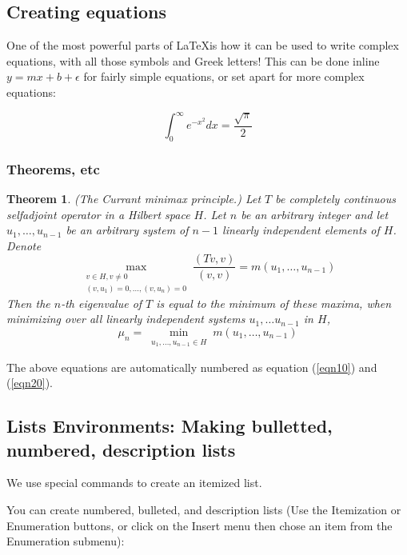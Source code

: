 \documentclass{book}\usepackage{knitr}
\newtheorem{theorem}{Theorem}
\begin{document}
\subsection{Creating equations}

One of the most powerful parts of \LaTeX is how it can be used to write complex equations, with all those symbols and Greek letters! This can be done inline $y = mx + b + \epsilon$ for fairly simple equations, or set apart for more complex equations:

\begin{equation}
\int_0^\infty e^{-x^2} dx=\frac{\sqrt{\pi}}{2}
\end{equation}

\subsubsection{Theorems, etc}
\begin{theorem}
(The Currant minimax principle.) Let $T$ be completely continuous selfadjoint operator
in a Hilbert space $H$. Let $n$ be an arbitrary integer and let $u_1,\ldots,u_{n-1}$ be
an arbitrary system of $n-1$ linearly independent elements of $H$. Denote
\begin{equation}
\max_{\substack{v\in H, v\neq
0\\(v,u_1)=0,\ldots,(v,u_n)=0}}\frac{(Tv,v)}{(v,v)}=m(u_1,\ldots, u_{n-1})
\label{eqn10}
\end{equation}
Then the $n$-th eigenvalue of $T$ is equal to the minimum of these maxima, when
minimizing over all linearly independent systems $u_1,\ldots u_{n-1}$ in $H$,
\begin{equation}
\mu_n = \min_{\substack{u_1,\ldots, u_{n-1}\in H}} m(u_1,\ldots, u_{n-1}) \label{eqn20}
\end{equation}
\end{theorem}
The above equations are automatically numbered as equation (\ref{eqn10}) and
(\ref{eqn20}).


\subsection*{Lists Environments: Making bulletted, numbered, description lists}

We use special commands to create an itemized list.

You can create numbered, bulleted, and description lists
(Use the Itemization or Enumeration buttons, or click on the Insert menu
then chose an item from the Enumeration submenu):
\end{document}
